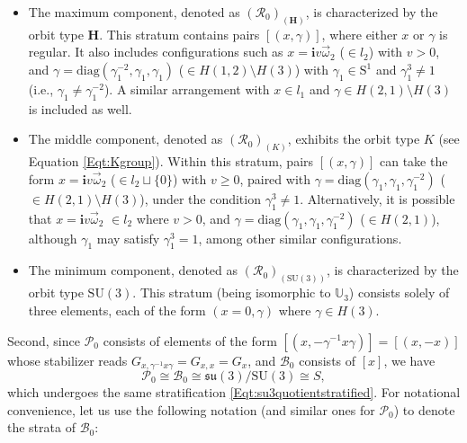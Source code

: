 \documentclass[12pt]{amsart}
\theoremstyle{definition}
\numberwithin{equation}{section}
\def\diag{\mathrm{diag}}
\newcommand{\Sone}{\mathrm{S}^1}
\newcommand{\Uthree}{\mathbb{U}_3}
\newcommand{\imagunit}{\mathbf{i}}
\newcommand{\SU}{\mathrm{SU}}
\newcommand{\su}{\mathfrak{su}}
\newcommand{\SUthree}{\SU(3)}
\newcommand{\SET}[1]{\{#1\}}
\newcommand{\Cartan}{\mathbf{H}}
\newcommand{\Rxizero}{\mathcal{R}_{0}}
\newcommand{\Pxizero}{\mathcal{P}_{0}}
\newcommand{\Bxizero}{\mathcal{B}_{0}}
\begin{document}
 \begin{itemize}
	\item[(1)] The maximum component, denoted as $(\Rxizero)_{(\Cartan)}$, is characterized by the orbit type $ \Cartan$. This stratum contains pairs $[(x,\gamma)]$, where either $x$ or $\gamma$ is regular. It also includes  configurations such as $x = \imagunit v \vec{\omega}_2$ ($\in {l_2}$) with      $v> 0$, and $\gamma = \diag(\gamma_1^{-2},\gamma_1,\gamma_1)$ ($\in H(1,2)\setminus H(3)$) with $\gamma_1\in \Sone$ and $\gamma_1^3\neq 1$ (i.e., $\gamma_1 \neq \gamma_1^{-2}$). A similar arrangement with $x\in {l_1}$ and $\gamma  \in H(2,1)\setminus H(3)$ is included as well.
	
	
	\item[(2)] 
	The middle component, denoted as $(\Rxizero)_{(K)}$, exhibits the orbit type $K$ (see Equation \eqref{Eqt:Kgroup}). 
	Within this stratum, pairs $[(x,\gamma)]$ can take the form $x = \imagunit v \vec{\omega}_2$  ($\in {l_2}\sqcup \SET{0}$) with $v\geqslant 0$, paired with $\gamma = \diag(\gamma_1,\gamma_1,\gamma_1^{-2})$ ($\in H(2,1)\setminus H(3)$), under the condition $\gamma_1^3 \neq 1$. Alternatively, it is possible that $x = \imagunit v \vec{\omega}_2 $ $\in {l_2}$  where $v > 0$, and $\gamma = \diag(\gamma_1,\gamma_1,\gamma_1^{-2})$ ($\in H(2,1)$), although $\gamma_1$ may satisfy    $\gamma_1^{3}=1$, among other similar configurations.
	
	\item[(3)] 
	The minimum component, denoted as $(\Rxizero)_{(\SU(3))}$, is characterized by the orbit type $\SUthree$. This stratum (being isomorphic to $\Uthree $) consists solely of three elements, each of the form $(x=0,\gamma )$ where $\gamma\in H(3)$.
	
\end{itemize}
Second, since $\Pxizero $  consists of elements of the form
$[(x,-{\gamma^{-1}}x\gamma )]=[(x,-x)]$ whose   stabilizer reads $G_{x,{\gamma^{-1}}x\gamma }=G_{x,x}=G_x$, and $\Bxizero $ consists of $[x]$, we have
   $$\Pxizero \cong \Bxizero \cong \su(3)/\SU(3)  \cong S, $$ which undergoes the same stratification \eqref{Eqt:su3quotientstratified}. For notational convenience, let us use the following notation  (and similar ones for $\Pxizero $) to denote the strata of $\Bxizero $:




 
\end{document}
